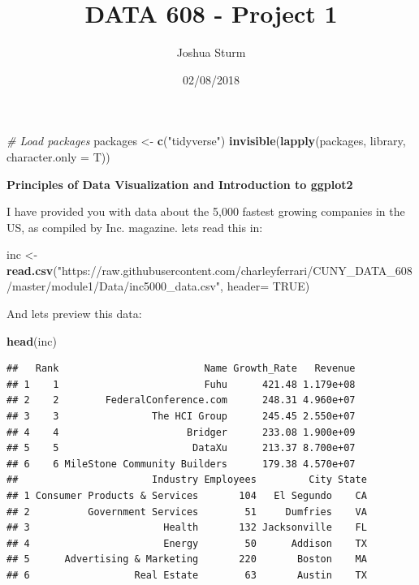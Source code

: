 \documentclass[]{article}
\title{DATA 608 - Project 1}
\author{Joshua Sturm}
\date{02/08/2018}
\newenvironment{Shaded}{\begin{snugshade}}{\end{snugshade}}
\newcommand{\KeywordTok}[1]{\textcolor[rgb]{0.13,0.29,0.53}{\textbf{#1}}}
\newcommand{\DataTypeTok}[1]{\textcolor[rgb]{0.13,0.29,0.53}{#1}}
\newcommand{\StringTok}[1]{\textcolor[rgb]{0.31,0.60,0.02}{#1}}
\newcommand{\CommentTok}[1]{\textcolor[rgb]{0.56,0.35,0.01}{\textit{#1}}}
\newcommand{\OtherTok}[1]{\textcolor[rgb]{0.56,0.35,0.01}{#1}}
\newcommand{\NormalTok}[1]{#1}
\begin{document}
\maketitle

\begin{Shaded}
\begin{Highlighting}[]
\CommentTok{# Load packages}
\NormalTok{packages <-}\StringTok{ }\KeywordTok{c}\NormalTok{(}\StringTok{"tidyverse"}\NormalTok{)}
\KeywordTok{invisible}\NormalTok{(}\KeywordTok{lapply}\NormalTok{(packages, library, }\DataTypeTok{character.only =}\NormalTok{ T))}
\end{Highlighting}
\end{Shaded}

\textbf{Principles of Data Visualization and Introduction to ggplot2}

I have provided you with data about the 5,000 fastest growing companies
in the US, as compiled by Inc. magazine. lets read this in:

\begin{Shaded}
\begin{Highlighting}[]
\NormalTok{inc <-}\StringTok{ }\KeywordTok{read.csv}\NormalTok{(}\StringTok{"https://raw.githubusercontent.com/charleyferrari/CUNY_DATA_608/master/module1/Data/inc5000_data.csv"}\NormalTok{, }\DataTypeTok{header=} \OtherTok{TRUE}\NormalTok{)}
\end{Highlighting}
\end{Shaded}

And lets preview this data:

\begin{Shaded}
\begin{Highlighting}[]
\KeywordTok{head}\NormalTok{(inc)}
\end{Highlighting}
\end{Shaded}

\begin{verbatim}
##   Rank                         Name Growth_Rate   Revenue
## 1    1                         Fuhu      421.48 1.179e+08
## 2    2        FederalConference.com      248.31 4.960e+07
## 3    3                The HCI Group      245.45 2.550e+07
## 4    4                      Bridger      233.08 1.900e+09
## 5    5                       DataXu      213.37 8.700e+07
## 6    6 MileStone Community Builders      179.38 4.570e+07
##                       Industry Employees         City State
## 1 Consumer Products & Services       104   El Segundo    CA
## 2          Government Services        51     Dumfries    VA
## 3                       Health       132 Jacksonville    FL
## 4                       Energy        50      Addison    TX
## 5      Advertising & Marketing       220       Boston    MA
## 6                  Real Estate        63       Austin    TX
\end{verbatim}
\end{document}
